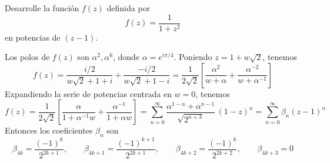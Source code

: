\begin{exercise}
Desarrolle la función $f(z)$ definida por
$$f(z) = \frac 1 {1 + z^2}$$
en potencias de $(z - 1)$.
\end{exercise}

\begin{solution}
Los polos de $f(z)$ son $\alpha^2, \alpha^6$, donde $\alpha = e^{i\pi/4}$. Poniendo $z = 1 + w \sqrt 2$, tenemos
$$
f(z)
    = \frac {i/2} {w \sqrt 2 + 1 + i} + \frac {-i/2} {w \sqrt 2 + 1 - i}
    = \frac 1 {2 \sqrt 2} \left[
        \frac {\alpha^2}    {w + \alpha} +
        \frac {\alpha^{-2}} {w + \alpha^{-1}} \right]
$$
Expandiendo la serie de potencias centrada en $w = 0$, tenemos
$$
f(z)
    = \frac 1 {2 \sqrt 2} \left[
        \frac \alpha        {1 + \alpha^{-1} w} +
        \frac {\alpha^{-1}} {1 + \alpha      w} \right]
    = \sum_{n=0}^\infty \frac {\alpha^{1-n} + \alpha^{n-1}} {\sqrt {2^{n+3}}} \, (1 - z)^n
    = \sum_{n=0}^\infty \beta_n (z - 1)^n
$$
Entonces los coeficientes $\beta_n$ son
$$
\beta_{4k} = \frac {(-1)^k} {2^{2k+1}}, \qquad
\beta_{4k+1} = \frac {(-1)^{k+1}} {2^{2k+1}}, \qquad
\beta_{4k+2} = \frac {(-1)^k} {2^{2k+2}}, \qquad
\beta_{4k+3} = 0
$$
\end{solution}
